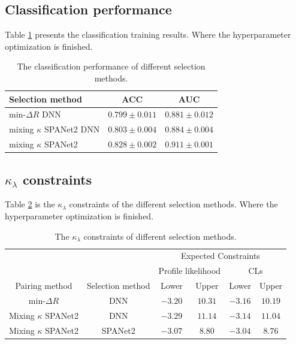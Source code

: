 \documentclass[12pt]{article}
\begin{document}
	\subsection{Classification performance}%
	\label{sub:classification_performance_summary2}
		Table \ref{tab:classification_results_summary3} presents the classification training results. Where the hyperparameter optimization is finished.
		\begin{table}[htpb]
			\centering
			\caption{The classification performance of different selection methods.}
			\label{tab:classification_results_summary3}
			\begin{tabular}{l|cc}
			Selection method          & ACC   & AUC   \\ \hline
			$\text{min-}\Delta R$ DNN   & $0.799 \pm 0.011$ & $0.881 \pm 0.012$ \\
			mixing $\kappa$ SPANet2 DNN & $0.803 \pm 0.004$ & $0.884 \pm 0.004$ \\
			mixing $\kappa$ SPANet2     & $0.828 \pm 0.002$ & $0.911 \pm 0.001$ 
			\end{tabular}			
		\end{table}
	\subsection{\texorpdfstring{$\kappa_\lambda$}{kappa} constraints}%
	\label{sub:kappa_constraints2}
		Table \ref{tab:kappa_constraint_summary3} is the $\kappa_\lambda$ constraints of the different selection methods. Where the hyperparameter optimization is finished.
		\begin{table}[htpb]
			\centering
			\caption{The $\kappa_\lambda$ constraints of different selection methods.}
			\label{tab:kappa_constraint_summary3}
			\begin{tabular}{cc|cc|cc}
									&                  & \multicolumn{4}{c}{Expected Constraints}                         \\
									&                  & \multicolumn{2}{c}{Profile likelihood} & \multicolumn{2}{c}{CLs} \\ \hline
			Pairing method          & Selection method & Lower              & Upper             & Lower       & Upper     \\ \hline
			$\text{min-}\Delta R$   & DNN              & $-3.20$            & $10.31$           & $-3.16$      & $10.19$    \\
			Mixing $\kappa$ SPANet2 & DNN              & $-3.29$            & $11.14$           & $-3.14$      & $11.04$   \\
			Mixing $\kappa$ SPANet2 & SPANet2          & $-3.07$            & $8.80$            & $-3.04$      & $8.76$   
			\end{tabular}		
		\end{table}
\end{document}
